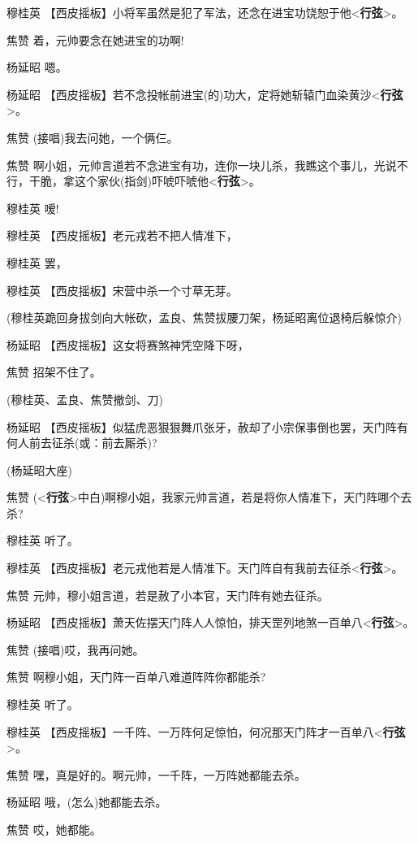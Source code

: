 穆桂英
【西皮摇板】小将军虽然是犯了军法，还念在进宝功饶恕于他\textless{}\textbf{行弦}\textgreater{}。

焦赞 着，元帅要念在她进宝的功啊!

杨延昭 嗯。

杨延昭
【西皮摇板】若不念投帐前进宝(的)功大，定将她斩辕门血染黄沙\textless{}\textbf{行弦}\textgreater{}。

焦赞 (接唱)我去问她，一个俩仨。

焦赞
啊小姐，元帅言道若不念进宝有功，连你一块儿杀，我瞧这个事儿，光说不行，干脆，拿这个家伙(指剑)吓唬吓唬他\textless{}\textbf{行弦}\textgreater{}。

穆桂英 嗳!

穆桂英 【西皮摇板】老元戎若不把人情准下，

穆桂英 罢，

穆桂英 【西皮摇板】宋营中杀一个寸草无芽。

(穆桂英跪回身拔剑向大帐砍，孟良、焦赞拔腰刀架，杨延昭离位退椅后躲惊介)

杨延昭 【西皮摇板】这女将赛煞神凭空降下呀，

焦赞 招架不住了。

(穆桂英、孟良、焦赞撤剑、刀)

杨延昭
【西皮摇板】似猛虎恶狠狠舞爪张牙，赦却了小宗保事倒也罢，天门阵有何人前去征杀(或：前去厮杀)?

(杨延昭大座)

焦赞
(\textless{}\textbf{行弦}\textgreater{}中白)啊穆小姐，我家元帅言道，若是将你人情准下，天门阵哪个去杀?

穆桂英 听了。

穆桂英
【西皮摇板】老元戎他若是人情准下。天门阵自有我前去征杀\textless{}\textbf{行弦}\textgreater{}。

焦赞 元帅，穆小姐言道，若是赦了小本官，天门阵有她去征杀。

杨延昭
【西皮摇板】萧天佐摆天门阵人人惊怕，排天罡列地煞一百单八\textless{}\textbf{行弦}\textgreater{}。

焦赞 (接唱)哎，我再问她。

焦赞 啊穆小姐，天门阵一百单八难道阵阵你都能杀?

穆桂英 听了。

穆桂英
【西皮摇板】一千阵、一万阵何足惊怕，何况那天门阵才一百单八\textless{}\textbf{行弦}\textgreater{}。

焦赞 嘿，真是好的。啊元帅，一千阵，一万阵她都能去杀。

杨延昭 哦，(怎么)她都能去杀。

焦赞 哎，她都能。

